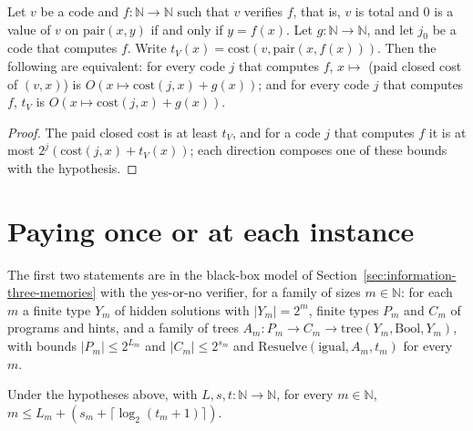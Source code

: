 \begin{theorem}
  \label{thm:information-paid-survives}
  \leanok
  Let $v$ be a code and $f : \mathbb{N} \to \mathbb{N}$ such that $v$ verifies $f$, that is, $v$ is
  total and $0$ is a value of $v$ on $\mathrm{pair}(x, y)$ if and only if $y = f(x)$. Let $g :
  \mathbb{N} \to \mathbb{N}$, and let $j_0$ be a code that computes $f$. Write $t_V(x) =
  \mathrm{cost}(v, \mathrm{pair}(x, f(x)))$. Then the following are equivalent: for every code $j$
  that computes $f$, $x \mapsto$ (paid closed cost of $(v, x)$) is $O(x \mapsto \mathrm{cost}(j, x)
  + g(x))$; and for every code $j$ that computes $f$, $t_V$ is $O(x \mapsto \mathrm{cost}(j, x) +
  g(x))$.
  \own{}
\end{theorem}

\begin{proof}
  \leanok
  The paid closed cost is at least $t_V$, and for a code $j$ that computes $f$ it is at most
  $2^j (\mathrm{cost}(j, x) + t_V(x))$; each direction composes one of these bounds with the
  hypothesis.
\end{proof}

\section{Paying once or at each instance}
\label{sec:information-two-accounts}

The first two statements are in the black-box model of Section~\ref{sec:information-three-memories}
with the yes-or-no verifier, for a family of sizes $m \in \mathbb{N}$: for each $m$ a finite type
$Y_m$ of hidden solutions with $|Y_m| = 2^m$, finite types $P_m$ and $C_m$ of programs and hints, and
a family of trees $A_m : P_m \to C_m \to \text{tree}(Y_m, \mathrm{Bool}, Y_m)$, with bounds
$|P_m| \le 2^{L_m}$ and $|C_m| \le 2^{s_m}$ and
$\mathrm{Resuelve}(\mathrm{igual}, A_m, t_m)$ for every $m$.

\begin{theorem}
  \label{thm:information-price-paid}
  \leanok
  Under the hypotheses above, with $L, s, t : \mathbb{N} \to \mathbb{N}$, for every $m \in
  \mathbb{N}$, $m \le L_m + (s_m + \lceil \log_2 (t_m + 1) \rceil)$.
  \own{}
\end{theorem}

